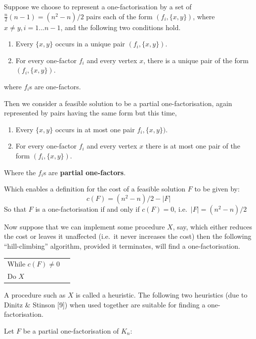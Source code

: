 \documentclass[
  12pt,
  a4paper]{book}
\begin{document}
Suppose we choose to represent a one-factorisation by a set of
\(\frac{n}{2}(n-1)=(n^2-n)/2\) pairs each of the form \((f_i,\{x,y\})\),
where \(x \neq y, i=1...n-1\), and the following two conditions hold.

\begin{enumerate}
\def\labelenumi{\arabic{enumi}.}
\item
  Every \(\{x,y\}\) occurs in a unique pair \((f_i,\{x,y\})\).
\item
  For every one-factor \(f_i\) and every vertex \(x\), there is a unique
  pair of the form \((f_i,\{x,y\})\).
\end{enumerate}

where \(f_i\)s are one-factors.

Then we consider a feasible solution to be a partial one-factorisation,
again represented by pairs having the same form but this time,

\begin{enumerate}
\def\labelenumi{\arabic{enumi}.}
\item
  Every \(\{x,y\}\) occurs in at most one pair \(f_i,\{x,y\})\).
\item
  For every one-factor \(f_i\) and every vertex \(x\) there is at most
  one pair of the form \((f_i,\{x,y\})\).
\end{enumerate}

Where the \(f_i\)s are \textbf{partial one-factors}.

Which enables a definition for the cost of a feasible solution \(F\) to
be given by: \[c(F) = (n^2-n)/2-|F|\] So that \(F\) is a
one-factorisation if and only if \(c(F)=0\), i.e.~\(|F|=(n^2-n)/2\)

Now suppose that we can implement some procedure \(X\), say, which
either reduces the cost or leaves it unaffected (i.e.~it never increases
the cost) then the following ``hill-climbing'' algorithm, provided it
terminates, will find a one-factorisation.

\begin{longtable}[]{@{}ll@{}}
\toprule
\endhead
While \(c(F) \neq 0\) &\tabularnewline
Do \(X\) &\tabularnewline
\bottomrule
\end{longtable}

A procedure such as \(X\) is called a heuristic. The following two
heuristics (due to Dinitz \& Stinson {[}9{]}) when used together are
suitable for finding a one-factorisation.

Let \(F\) be a partial one-factorisation of \(K_n\):
\end{document}
